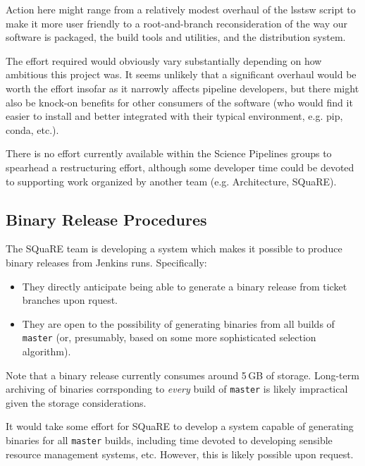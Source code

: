 \documentclass[letterpaper]{scrartcl}
\begin{document}
Action here might range from a relatively modest overhaul of the lsstsw script
to make it more user friendly to a root-and-branch reconsideration of the way
our software is packaged, the build tools and utilities, and the distribution
system.

The effort required would obviously vary substantially depending on how
ambitious this project was. It seems unlikely that a significant overhaul
would be worth the effort insofar as it narrowly affects pipeline developers,
but there might also be knock-on benefits for other consumers of the software
(who would find it easier to install and better integrated with their typical
environment, e.g. pip, conda, etc.).

There is no effort currently available within the Science Pipelines groups to
spearhead a restructuring effort, although some developer time could be
devoted to supporting work organized by another team (e.g. Architecture,
SQuaRE).

\subsection{Binary Release Procedures}
\label{sec:binaryrelease}

The SQuaRE team is developing a system which makes it possible to produce
binary releases from Jenkins runs. Specifically:

\begin{itemize}

  \item{They directly anticipate being able to generate a binary release from
  ticket branches upon rquest.}

  \item{They are open to the possibility of generating binaries from all
  builds of \texttt{master} (or, presumably, based on some more sophisticated
  selection algorithm).}

\end{itemize}

Note that a binary release currently consumes around 5\,GB of storage.
Long-term archiving of binaries corrsponding to \textit{every} build of
\texttt{master} is likely impractical given the storage considerations.

It would take some effort for SQuaRE to develop a system capable of generating
binaries for all \texttt{master} builds, including time devoted to developing
sensible resource management systems, etc. However, this is likely possible
upon request.
\end{document}
